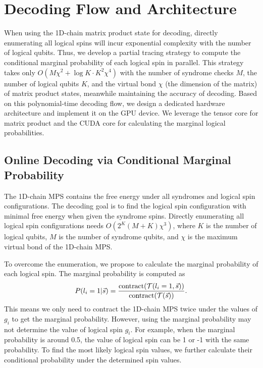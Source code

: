 
\section{\papername Decoding Flow and Architecture}

When using the 1D-chain matrix product state for decoding, directly enumerating all logical spins will incur exponential complexity with the number of logical qubits. Thus, we develop a partial tracing strategy to compute the conditional marginal probability of each logical spin in parallel. This strategy takes only $O(M\chi^2+\log K \cdot K^2\chi^4)$ with the number of syndrome checks $M$, the number of logical qubits $K$, and the virtual bond $\chi$  (the dimension of the matrix) of matrix product states, meanwhile maintaining the accuracy of decoding. Based on this polynomial-time decoding flow, we design a dedicated hardware architecture and implement it on the GPU device. We leverage the tensor core for matrix product and the CUDA core for calculating the marginal logical probabilities.

\subsection{Online Decoding via Conditional Marginal Probability}

The 1D-chain MPS contains the free energy under all syndromes and logical spin configurations. The decoding goal is to find the logical spin configuration with minimal free energy when given the syndrome spins. Directly enumerating all logical spin configurations needs $O(2^K(M+K)\chi^3)$, where $K$ is the number of logical qubits, $M$ is the number of syndrome qubits, and $\chi$ is the maximum virtual bond of the 1D-chain MPS.

To overcome the enumeration, we propose to calculate the marginal probability of each logical spin. The marginal probability is computed as 
\begin{equation}\small
    P(l_i=1|\vec{s}) = 
    \frac{{\text{contract}}(\mathcal{T}(l_i=1,\vec{s}))}{\text{contract}(\mathcal{T}(\vec{s}))}. 
    \label{}
\end{equation}
This means we only need to contract the 1D-chain MPS twice under the values of $g_i$ to get the marginal probability. However, using the marginal probability may not determine the value of logical spin $g_i$. For example, when the marginal probability is around 0.5, the value of logical spin can be 1 or -1 with the same probability. To find the most likely logical spin values, we further calculate their conditional probability under the determined spin values. 




